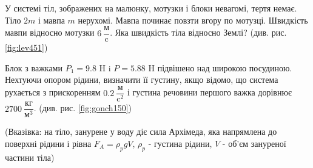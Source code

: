 \begin{problem}{11}
	У системі тіл, зображених на малюнку, мотузки і блоки невагомі, тертя немає. Тіло $2m$ і мавпа $m$ нерухомі.
	Мавпа починає повзти вгору по мотузці. Швидкість мавпи відносно мотузки $6~\dfrac{\text{м}}{\text{c}} $. Яка швидкість тіла відносно Землі? (див. рис. \ref{fig:lev451})
\end{problem}

\begin{problem}{13}
	Блок з важками $P_1 = 9.8$ H i $P = 5.88$ H підвішено над широкою посудиною. Нехтуючи опором рідини, визначити її густину, якщо відомо, що система рухається з прискоренням $0.2~\dfrac{\text{м}}{\text{c}^2} $ і густина речовини першого важка дорівнює $2700 ~\dfrac{\text{кг}}{\text{м}^3}$. (див. рис. \ref{fig:gonch150})
	
	(Вказівка: на тіло, занурене у воду діє сила Архімеда, яка напрямлена до поверхні рідини і рівна $F_A = \rho_p gV$, $\rho_p $ - густина рідини, $V$ - об'єм зануреної частини тіла)	
\end{problem}